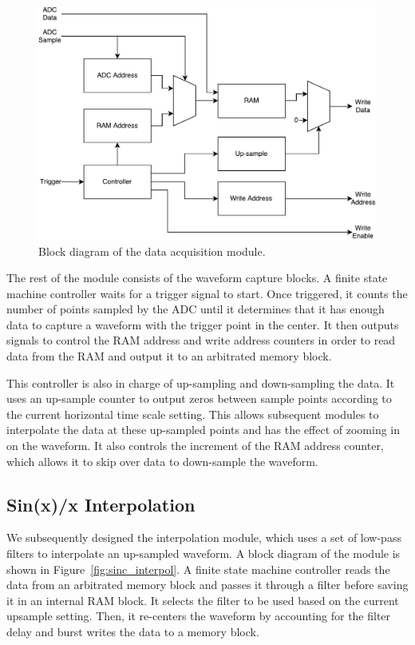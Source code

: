 \documentclass[journal,hidelinks]{IEEEtran}
\begin{document}
\begin{figure}[!htb]
  \centering
  \includegraphics[width=\columnwidth]{diagrams/data_acquisition.pdf}
  \caption{Block diagram of the data acquisition module.}
  \label{fig:data_acquisition}
\end{figure}

The rest of the module consists of the waveform capture blocks. A finite state machine controller waits for a trigger signal to start. Once triggered, it counts the number of points sampled by the ADC until it determines that it has enough data to capture a waveform with the trigger point in the center. It then outputs signals to control the RAM address and write address counters in order to read data from the RAM and output it to an arbitrated memory block.

This controller is also in charge of up-sampling and down-sampling the data. It uses an up-sample counter to output zeros between sample points according to the current horizontal time scale setting. This allows subsequent modules to interpolate the data at these up-sampled points and has the effect of zooming in on the waveform. It also controls the increment of the RAM address counter, which allows it to skip over data to down-sample the waveform.

\subsection{Sin(x)/x Interpolation}

We subsequently designed the interpolation module, which uses a set of low-pass filters to interpolate an up-sampled waveform. A block diagram of the module is shown in Figure~\ref{fig:sinc_interpol}. A finite state machine controller reads the data from an arbitrated memory block and passes it through a filter before saving it in an internal RAM block. It selects the filter to be used based on the current upsample setting. Then, it re-centers the waveform by accounting for the filter delay and burst writes the data to a memory block.
\end{document}
